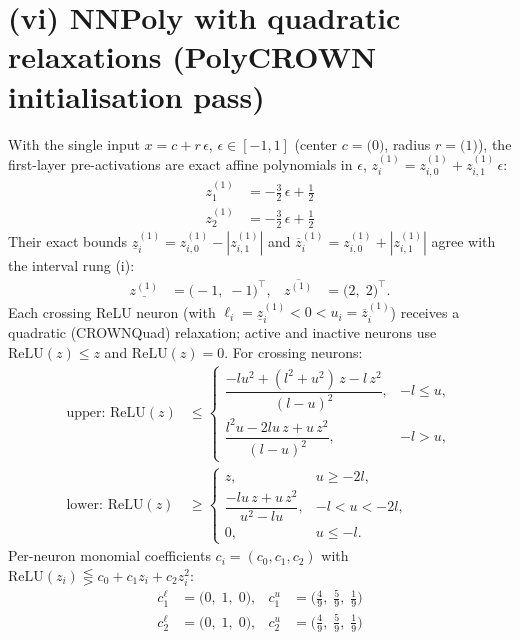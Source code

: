 \documentclass[11pt]{article}
\begin{document}
\section{(vi) NNPoly with quadratic relaxations (PolyCROWN initialisation pass)}
With the single input $x = c + r\,\epsilon$, $\epsilon \in [-1, 1]$ (center $c = \bigl(0\bigr)$, radius $r = \bigl(1\bigr)$), the first-layer pre-activations are exact affine polynomials in $\epsilon$, $z^{(1)}_i = z^{(1)}_{i,0} + z^{(1)}_{i,1}\,\epsilon$:
\begin{align*}
z^{(1)}_{1} &= -\frac{3}{2}\,\epsilon + \frac{1}{2} \\
z^{(1)}_{2} &= -\frac{3}{2}\,\epsilon + \frac{1}{2}
\end{align*}
Their exact bounds $\underline{z}^{(1)}_i = z^{(1)}_{i,0} - |z^{(1)}_{i,1}|$ and $\overline{z}^{(1)}_i = z^{(1)}_{i,0} + |z^{(1)}_{i,1}|$ agree with the interval rung (i):
\begin{align*}
\underline{z^{(1)}} &= \bigl(-1,\; -1\bigr)^{\!\top}, & \overline{z^{(1)}} &= \bigl(2,\; 2\bigr)^{\!\top}.
\end{align*}
Each crossing ReLU neuron (with $\ell_i = \underline{z}^{(1)}_i < 0 < u_i = \overline{z}^{(1)}_i$)
receives a quadratic (CROWNQuad) relaxation; active and inactive neurons use $\mathrm{ReLU}(z) \le z$
and $\mathrm{ReLU}(z) = 0$. For crossing neurons:
\begin{align*}
\text{upper: } \mathrm{ReLU}(z) &\le \begin{cases} \dfrac{-l u^2 + (l^2 + u^2)\, z - l\, z^2}{(l - u)^2}, & -l \le u, \\[3mm] \dfrac{l^2 u - 2 l u\, z + u\, z^2}{(l - u)^2}, & -l > u, \end{cases} \\[2mm]
\text{lower: } \mathrm{ReLU}(z) &\ge \begin{cases} z, & u \ge -2l, \\[3mm] \dfrac{-l u\, z + u\, z^2}{u^2 - l u}, & -l < u < -2l, \\[3mm] 0, & u \le -l. \end{cases}
\end{align*}
Per-neuron monomial coefficients $c_i = (c_0, c_1, c_2)$ with $\mathrm{ReLU}(z_i) \lesseqgtr c_0 + c_1 z_i + c_2 z_i^2$:
\begin{align*}
c^{\ell}_{1} &= \bigl(0,\; 1,\; 0\bigr), & c^{u}_{1} &= \bigl(\frac{4}{9},\; \frac{5}{9},\; \frac{1}{9}\bigr) \\
c^{\ell}_{2} &= \bigl(0,\; 1,\; 0\bigr), & c^{u}_{2} &= \bigl(\frac{4}{9},\; \frac{5}{9},\; \frac{1}{9}\bigr)
\end{align*}
\end{document}
